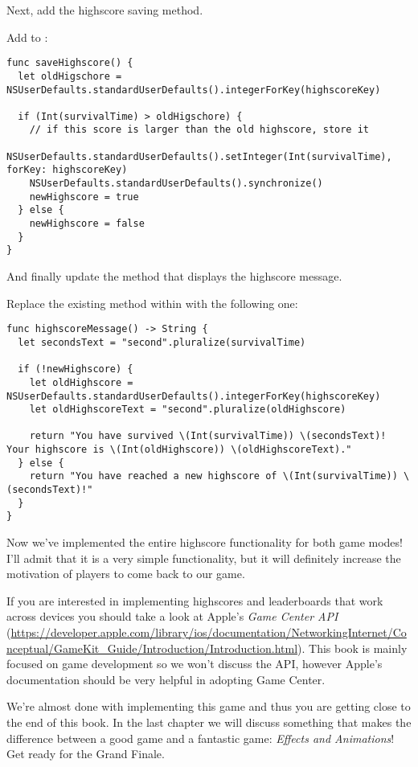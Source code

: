 Next, add the highscore saving method.

\begin{leftbar}
Add  to :
\begin{lstlisting}
func saveHighscore() {
  let oldHigschore = NSUserDefaults.standardUserDefaults().integerForKey(highscoreKey)

  if (Int(survivalTime) > oldHigschore) {
    // if this score is larger than the old highscore, store it
    NSUserDefaults.standardUserDefaults().setInteger(Int(survivalTime), forKey: highscoreKey)
    NSUserDefaults.standardUserDefaults().synchronize()
    newHighscore = true
  } else {
    newHighscore = false
  }
}
\end{lstlisting}
\end{leftbar}

And finally update the method that displays the highscore message.
\begin{leftbar}
Replace the existing  method within
 with the following one:
\begin{lstlisting}
func highscoreMessage() -> String {
  let secondsText = "second".pluralize(survivalTime)

  if (!newHighscore) {
    let oldHighscore = NSUserDefaults.standardUserDefaults().integerForKey(highscoreKey)
    let oldHighscoreText = "second".pluralize(oldHighscore)
    
    return "You have survived \(Int(survivalTime)) \(secondsText)! Your highscore is \(Int(oldHighscore)) \(oldHighscoreText)."
  } else {
    return "You have reached a new highscore of \(Int(survivalTime)) \(secondsText)!"
  }
}
\end{lstlisting}
\end{leftbar}

Now we've implemented the entire highscore functionality for both game modes!
I'll admit that it is a very simple functionality, but it will definitely
increase the motivation of players to come back to our game.

\begin{details}[frametitle={Advanced Highscores}]
If you are interested in implementing highscores and leaderboards that work
across devices you should take a look at Apple's \textit{Game Center API}
(\url{https://developer.apple.com/library/ios/documentation/NetworkingInternet/Conceptual/GameKit_Guide/Introduction/Introduction.html}).
This book is mainly focused on game development so we won't discuss
the API, however Apple's documentation should be very helpful in
adopting Game Center.
\end{details}

We're almost done with implementing this game and thus you are getting close to
the end of this book. In the last chapter we will discuss something that makes
the difference between a good game and a fantastic game: \textit{Effects and
Animations}! Get ready for the Grand Finale.
